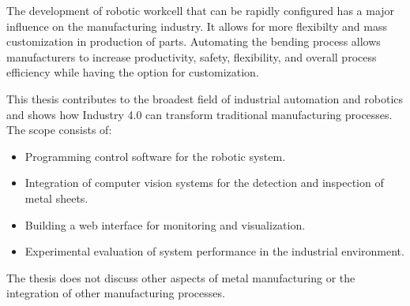The development of robotic workcell that can be rapidly configured has a major influence on the manufacturing industry. It allows for more flexibilty and mass customization in production of parts. \cite{CHEN2001199} Automating the bending process allows manufacturers to increase productivity, safety, flexibility, and overall process efficiency while having the option for customization. \cite[page 9]{russmann2015industry} 

This thesis contributes to the broadest field of industrial automation and robotics and shows how Industry 4.0 can transform traditional manufacturing processes.
The scope consists of:
\begin{itemize}
    \item Programming control software for the robotic system. 
    \item Integration of computer vision systems for the detection and inspection of metal sheets.
    \item Building a web interface for monitoring and visualization.
    \item Experimental evaluation of system performance in the industrial environment. 
\end{itemize}

The thesis does not discuss other aspects of metal manufacturing or the integration of other manufacturing processes.